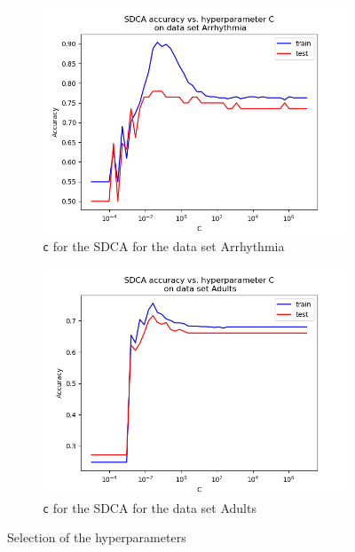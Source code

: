 \documentclass{article}
\begin{document}
\begin{figure}[H]
	\begin{subfigure}[t]{0.45\linewidth}
		\includegraphics[width=\linewidth]{figs/hyperparams/arrhythmia_sdca_c.png}
		\caption{\texttt{c} for the SDCA for the data set Arrhythmia}
	\end{subfigure}
	\begin{subfigure}[t]{0.45\linewidth}
		\includegraphics[width=\linewidth]{figs/hyperparams/adults_sdca_c.png}
		\caption{\texttt{c} for the SDCA for the data set Adults}
	\end{subfigure}
	\caption{Selection of the hyperparameters}
\end{figure}


\end{document}
